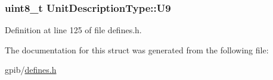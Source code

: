 \hypertarget{structUnitDescriptionType_a23817cabba1909bcf5a0732ed5da1351}{
\subsubsection[{U9}]{\setlength{\rightskip}{0pt plus 5cm}uint8\-\_\-t Unit\-Description\-Type\-::\-U9}}\label{structUnitDescriptionType_a23817cabba1909bcf5a0732ed5da1351}


Definition at line 125 of file defines.\-h.



The documentation for this struct was generated from the following file\-:\begin{DoxyCompactItemize}
\item 
gpib/\hyperlink{defines_8h}{defines.\-h}\end{DoxyCompactItemize}
